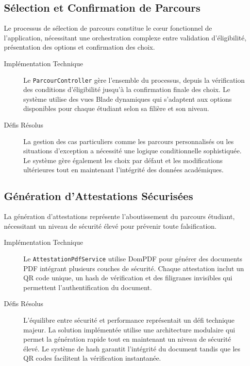 \documentclass[12pt,a4paper]{report}
\begin{document}
\subsection{Sélection et Confirmation de Parcours}

Le processus de sélection de parcours constitue le cœur fonctionnel de l'application, nécessitant une orchestration complexe entre validation d'éligibilité, présentation des options et confirmation des choix.

\begin{description}
\item[Implémentation Technique] Le \texttt{ParcourController} gère l'ensemble du processus, depuis la vérification des conditions d'éligibilité jusqu'à la confirmation finale des choix. Le système utilise des vues Blade dynamiques qui s'adaptent aux options disponibles pour chaque étudiant selon sa filière et son niveau.

\item[Défis Résolus] La gestion des cas particuliers comme les parcours personnalisés ou les situations d'exception a nécessité une logique conditionnelle sophistiquée. Le système gère également les choix par défaut et les modifications ultérieures tout en maintenant l'intégrité des données académiques.
\end{description}

\subsection{Génération d'Attestations Sécurisées}

La génération d'attestations représente l'aboutissement du parcours étudiant, nécessitant un niveau de sécurité élevé pour prévenir toute falsification.

\begin{description}
\item[Implémentation Technique] Le \texttt{AttestationPdfService} utilise DomPDF pour générer des documents PDF intégrant plusieurs couches de sécurité. Chaque attestation inclut un QR code unique, un hash de vérification et des filigranes invisibles qui permettent l'authentification du document.

\item[Défis Résolus] L'équilibre entre sécurité et performance représentait un défi technique majeur. La solution implémentée utilise une architecture modulaire qui permet la génération rapide tout en maintenant un niveau de sécurité élevé. Le système de hash garantit l'intégrité du document tandis que les QR codes facilitent la vérification instantanée.
\end{description}
\end{document}
